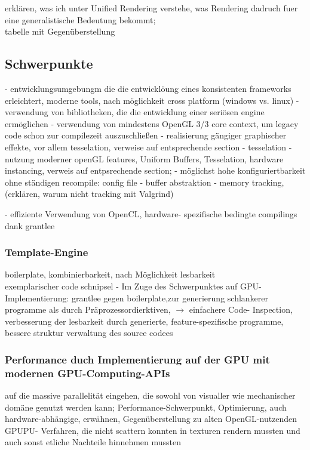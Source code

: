 erklären, was ich unter Unified Rendering verstehe, was Rendering dadruch fuer eine generalistische Bedeutung bekommt;\\
tabelle mit Gegenüberstellung




\subsection{Schwerpunkte}

	- entwicklungsumgebungm die die entwicklöung eines konsistenten frameworks erleichtert, moderne tools, nach möglichkeit cross platform (windows vs. linux)
	- verwendung von bibliotheken, die die entwicklung einer seriösen engine ermöglichen
	- verwendung von mindestens OpenGL 3/3 core context, um legacy code schon zur compilezeit auszuschließen
	- realisierung gängiger graphischer effekte, vor allem tesselation, verweise auf entsprechende section
		- tesselation
	- nutzung moderner openGL features, Uniform Buffers, Tesselation, hardware instancing, verweis auf entpsrechende section;
	- möglichst hohe konfiguriertbarkeit ohne ständigen recompile: config file
	- buffer abstraktion
	- memory tracking, (erklären, warum nicht tracking mit Valgrind)

	- effiziente Verwendung von OpenCL, hardware- spezifische bedingte compilings dank grantlee
	
	

	\subsubsection{Template-Engine}
	boilerplate, kombinierbarkeit, nach Möglichkeit lesbarkeit\\
	exemplarischer code schnipsel
		-  Im Zuge des Schwerpunktes auf GPU-Implementierung:
		grantlee gegen boilerplate,zur generierung schlankerer programme als durch Präprozessordierktiven, 
		 $\rightarrow$ einfachere Code- Inspection, verbesserung der lesbarkeit durch generierte, feature-spezifische 	
		 programme,
  		bessere struktur verwaltung des source codees

	\subsubsection{Performance duch Implementierung auf der GPU mit modernen GPU-Computing-APIs}
	auf die massive parallelität eingehen, die sowohl von visualler wie mechanischer domäne genutzt werden kann;
	Performance-Schwerpunkt, Optimierung, auch hardware-abhängige, erwähnen, Gegenüberstellung zu alten OpenGL-nutzenden 	
	GPUPU- Verfahren, die nicht scattern konnten in texturen rendern mussten und auch sonst etliche Nachteile hinnehmen 	
	mussten

